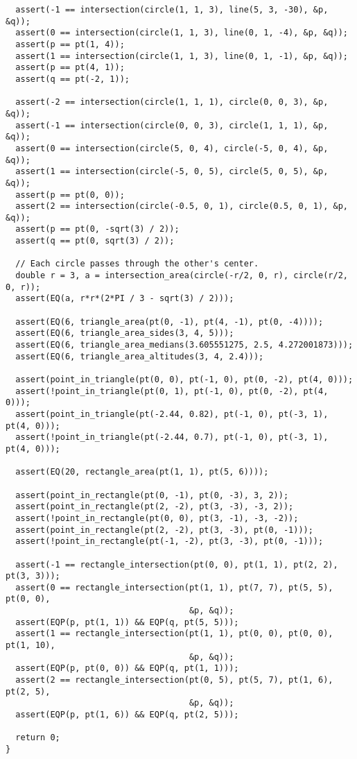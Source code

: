 \begin{lstlisting}
  assert(-1 == intersection(circle(1, 1, 3), line(5, 3, -30), &p, &q));
  assert(0 == intersection(circle(1, 1, 3), line(0, 1, -4), &p, &q));
  assert(p == pt(1, 4));
  assert(1 == intersection(circle(1, 1, 3), line(0, 1, -1), &p, &q));
  assert(p == pt(4, 1));
  assert(q == pt(-2, 1));

  assert(-2 == intersection(circle(1, 1, 1), circle(0, 0, 3), &p, &q));
  assert(-1 == intersection(circle(0, 0, 3), circle(1, 1, 1), &p, &q));
  assert(0 == intersection(circle(5, 0, 4), circle(-5, 0, 4), &p, &q));
  assert(1 == intersection(circle(-5, 0, 5), circle(5, 0, 5), &p, &q));
  assert(p == pt(0, 0));
  assert(2 == intersection(circle(-0.5, 0, 1), circle(0.5, 0, 1), &p, &q));
  assert(p == pt(0, -sqrt(3) / 2));
  assert(q == pt(0, sqrt(3) / 2));

  // Each circle passes through the other's center.
  double r = 3, a = intersection_area(circle(-r/2, 0, r), circle(r/2, 0, r));
  assert(EQ(a, r*r*(2*PI / 3 - sqrt(3) / 2)));

  assert(EQ(6, triangle_area(pt(0, -1), pt(4, -1), pt(0, -4))));
  assert(EQ(6, triangle_area_sides(3, 4, 5)));
  assert(EQ(6, triangle_area_medians(3.605551275, 2.5, 4.272001873)));
  assert(EQ(6, triangle_area_altitudes(3, 4, 2.4)));

  assert(point_in_triangle(pt(0, 0), pt(-1, 0), pt(0, -2), pt(4, 0)));
  assert(!point_in_triangle(pt(0, 1), pt(-1, 0), pt(0, -2), pt(4, 0)));
  assert(point_in_triangle(pt(-2.44, 0.82), pt(-1, 0), pt(-3, 1), pt(4, 0)));
  assert(!point_in_triangle(pt(-2.44, 0.7), pt(-1, 0), pt(-3, 1), pt(4, 0)));

  assert(EQ(20, rectangle_area(pt(1, 1), pt(5, 6))));

  assert(point_in_rectangle(pt(0, -1), pt(0, -3), 3, 2));
  assert(point_in_rectangle(pt(2, -2), pt(3, -3), -3, 2));
  assert(!point_in_rectangle(pt(0, 0), pt(3, -1), -3, -2));
  assert(point_in_rectangle(pt(2, -2), pt(3, -3), pt(0, -1)));
  assert(!point_in_rectangle(pt(-1, -2), pt(3, -3), pt(0, -1)));

  assert(-1 == rectangle_intersection(pt(0, 0), pt(1, 1), pt(2, 2), pt(3, 3)));
  assert(0 == rectangle_intersection(pt(1, 1), pt(7, 7), pt(5, 5), pt(0, 0),
                                     &p, &q));
  assert(EQP(p, pt(1, 1)) && EQP(q, pt(5, 5)));
  assert(1 == rectangle_intersection(pt(1, 1), pt(0, 0), pt(0, 0), pt(1, 10),
                                     &p, &q));
  assert(EQP(p, pt(0, 0)) && EQP(q, pt(1, 1)));
  assert(2 == rectangle_intersection(pt(0, 5), pt(5, 7), pt(1, 6), pt(2, 5),
                                     &p, &q));
  assert(EQP(p, pt(1, 6)) && EQP(q, pt(2, 5)));

  return 0;
}
\end{lstlisting}

